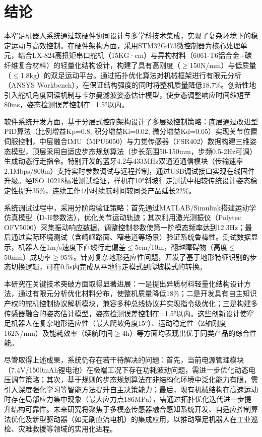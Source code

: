 \documentclass[a4paper,fontset=windows]{ctexart}
\begin{document}
\section{结论}
本窄足机器人系统通过软硬件协同设计与多学科技术集成，实现了复杂环境下的稳定运动与高效控制。在硬件架构方面，采用STM32G473微控制器为核心处理单元，结合LX-824高扭矩串口舵机（15KG·cm）与异构材料（6061-T6铝合金+碳纤维复合材料）的轻量化结构设计，构建了具有高刚度（$\geq$150N/mm）与低质量（$\leq$1.8kg）的双足运动平台。通过拓扑优化算法对机械框架进行有限元分析（ANSYS Workbench），在保证结构强度的同时将整机质量降低18.7\%。创新性地引入舵机角度回读机制与卡尔曼滤波姿态估计模型，使步态调整响应时间缩短至80ms，姿态检测误差控制在±1.5°以内。

软件系统开发方面，基于分层式控制架构设计了多层级控制策略：底层通过改进型PID算法（比例增益Kp=0.8, 积分增益Ki=0.02, 微分增益Kd=0.05）实现关节位置伺服控制，中层融合IMU（MPU6050）与力觉传感器（FSR402）数据构建三维姿态模型，顶层采用自适应步态规划算法（步长范围50-150mm，步频0.5-2Hz可调）生成动态行走指令。特别开发的蓝牙4.2与433MHz双通道通信模块（传输速率2.1Mbps/800m）支持实时参数调试与远程控制，通过USB调试接口实现在线固件升级。经ISO 10218标准测试验证，样机在10°斜坡行走测试中相较传统设计姿态稳定性提升35\%，连续工作4小时续航时间较同类产品延长22\%。

系统调试过程中，采用分阶段验证策略：首先通过MATLAB/Simulink搭建运动学仿真模型（D-H参数法），优化关节运动轨迹；其次利用激光测振仪（Polytec OFV5000）采集振动响应数据，调整控制参数使第一阶模态频率达到12.3Hz；最后通过实际环境测试（含崎岖路面、窄巷道等场景）验证系统鲁棒性。测试数据显示，机器人在1m/s速度下直线行走偏差$\leq$5cm/10m，翻越障碍物（高度$\leq$50mm）成功率$\geq$95\%。针对复杂地形适应性问题，开发了基于地形特征识别的步态切换逻辑，可在0.5s内完成从平地行走模式到爬坡模式的转换。

本研究在关键技术突破方面取得显著进展：一是提出异质材料轻量化结构设计方法，通过有限元分析优化材料分布，使整机质量降低18\%；二是开发具有自主知识产权的舵机控制协议解析模块，兼容多种总线协议并实现指令级优化；三是构建多传感器融合的姿态估计模型，姿态检测误差控制在±1.5°以内。这些创新设计使窄足机器人在复杂地形适应性（最大爬坡角度15°）、运动稳定性（Z轴刚度162N/mm）及能耗效率（续航时间$\geq$4h）等方面均表现出优于同类产品的综合性能。

尽管取得上述成果，系统仍存在若干待解决的问题：首先，当前电源管理模块（7.4V/1500mAh锂电池）在极端工况下存在功耗波动问题，需进一步优化动态电压调节策略；其次，基于规则的步态规划算法在非结构化环境中泛化能力有限，需引入深度强化学习等智能方法提升自主决策能力；最后，现有机械结构在高速运动时存在局部应力集中现象（最大应力点186MPa），需通过拓扑优化迭代进一步提升结构可靠性。未来研究将聚焦于多模态传感器融合感知系统开发、自适应控制算法优化及新型驱动器（如无刷直流电机）的集成应用，以推动窄足机器人在工业巡检、灾难救援等领域的实用化进程。
\end{document}
